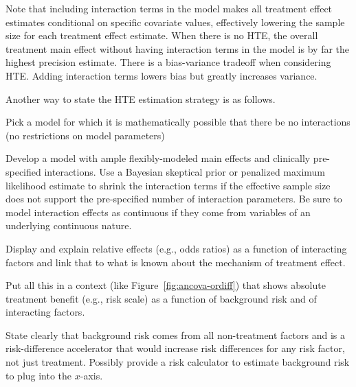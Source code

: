 Note that including interaction terms in the model makes all treatment
effect estimates conditional on specific covariate values, effectively
lowering the sample size for each treatment effect estimate.  When
there is no HTE, the overall treatment main effect without having interaction
terms in the model is by far the highest precision estimate.  There is
a bias-variance tradeoff when considering HTE.  Adding interaction
terms lowers bias but greatly increases variance.

Another way to state the HTE estimation strategy is as follows.
\be
\item Pick a model for which it is mathematically possible that there
  be no interactions (no restrictions on model parameters)
\item Develop a model with ample flexibly-modeled main effects and
  clinically pre-specified interactions.  Use a Bayesian skeptical
  prior or penalized maximum likelihood estimate to shrink the
  interaction terms if the effective sample size does not support the
  pre-specified number of interaction parameters.  Be sure to model
  interaction effects as continuous if they come from variables of an
  underlying continuous nature.
\item Display and explain relative effects (e.g., odds ratios) as a
  function of interacting factors and link that to what is known about
  the mechanism of treatment effect.
\item Put all this in a context (like Figure~\ref{fig:ancova-ordiff})
  that shows absolute treatment benefit (e.g., risk scale) as a
  function of background risk and of interacting factors.
\item State clearly that background risk comes from all non-treatment
  factors and is a risk-difference accelerator that would increase
  risk differences for any risk factor, not just treatment.  Possibly
  provide a risk calculator to estimate background risk to plug into
  the $x$-axis.
\ee

